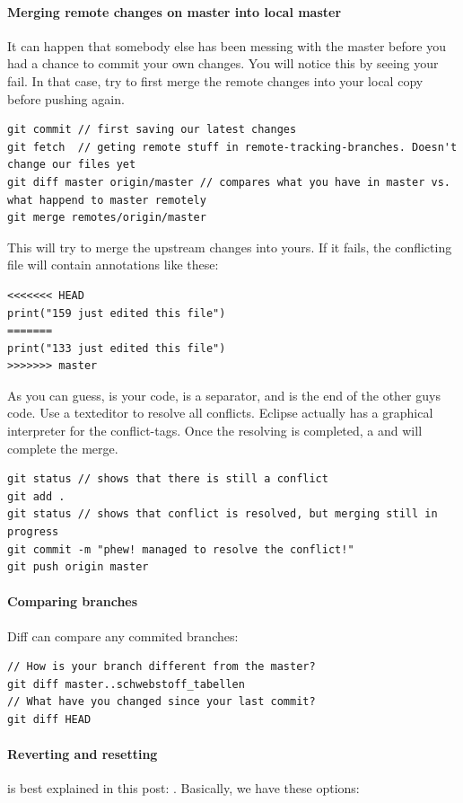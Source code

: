 \paragraph{Merging remote changes on master into local master} It can happen that somebody else has been messing with the master before you had a chance to commit your own changes. You will notice this by seeing your  fail. In that case, try to first merge the remote changes into your local copy before pushing again. 
\begin{lstlisting}
git commit // first saving our latest changes
git fetch  // geting remote stuff in remote-tracking-branches. Doesn't change our files yet
git diff master origin/master // compares what you have in master vs. what happend to master remotely
git merge remotes/origin/master
\end{lstlisting}
This will try to merge the upstream changes into yours. If it fails, the conflicting file will contain annotations like these: 
\begin{lstlisting}
<<<<<<< HEAD
print("159 just edited this file")
=======
print("133 just edited this file")
>>>>>>> master
\end{lstlisting}
As you can guess,  is your code, \inlinecode{===} is a separator, and  is the end of the other guys code. 
Use a texteditor to resolve all conflicts. Eclipse actually has a graphical interpreter for the conflict-tags. Once the resolving is completed, a  and  will complete the merge.
\begin{lstlisting}
git status // shows that there is still a conflict
git add .
git status // shows that conflict is resolved, but merging still in progress
git commit -m "phew! managed to resolve the conflict!"
git push origin master
\end{lstlisting}


\paragraph{Comparing branches} Diff can compare any commited branches: 
\begin{lstlisting}
// How is your branch different from the master?
git diff master..schwebstoff_tabellen
// What have you changed since your last commit?
git diff HEAD
\end{lstlisting}

\paragraph{Reverting and resetting} is best explained in this post: . Basically, we have these options: 

